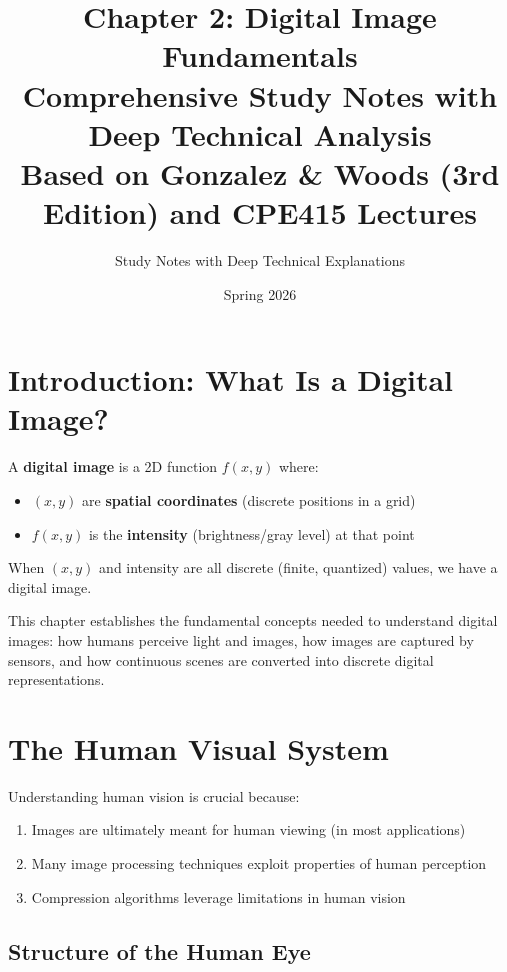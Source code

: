 \documentclass[12pt,a4paper]{article}
\title{\textbf{Chapter 2: Digital Image Fundamentals}\\
\Large Comprehensive Study Notes with Deep Technical Analysis\\
\normalsize Based on Gonzalez \& Woods (3rd Edition) and CPE415 Lectures}
\author{Study Notes with Deep Technical Explanations}
\date{Spring 2026}
\begin{document}
\maketitle
\tableofcontents
\newpage

\section{Introduction: What Is a Digital Image?}

\begin{conceptbox}
A \textbf{digital image} is a 2D function $f(x, y)$ where:
\begin{itemize}
    \item $(x, y)$ are \textbf{spatial coordinates} (discrete positions in a grid)
    \item $f(x, y)$ is the \textbf{intensity} (brightness/gray level) at that point
\end{itemize}
When $(x, y)$ and intensity are all discrete (finite, quantized) values, we have a digital image.
\end{conceptbox}

This chapter establishes the fundamental concepts needed to understand digital images: how humans perceive light and images, how images are captured by sensors, and how continuous scenes are converted into discrete digital representations.

\section{The Human Visual System}

Understanding human vision is crucial because:
\begin{enumerate}
    \item Images are ultimately meant for human viewing (in most applications)
    \item Many image processing techniques exploit properties of human perception
    \item Compression algorithms leverage limitations in human vision
\end{enumerate}

\subsection{Structure of the Human Eye}
\end{document}
